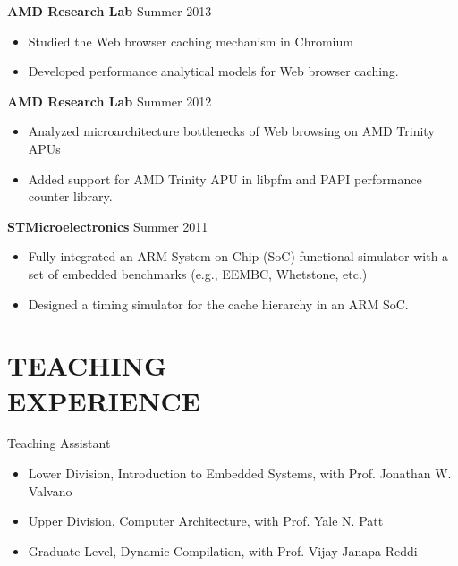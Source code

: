 \documentclass[margin, 9pt]{res} %
\begin{document}
\begin{resume}
{\textbf{AMD Research Lab}} \hfill{Summer 2013}\\
\vspace*{-10pt}
\begin{itemize}[leftmargin=*] \itemsep -3pt
\vspace*{-5pt}
	\item Studied the Web browser caching mechanism in Chromium
	\item Developed performance analytical models for Web browser caching.
\end{itemize}

\medskip
{\textbf{AMD Research Lab}} \hfill{Summer 2012}\\
\vspace*{-10pt}
\begin{itemize}[leftmargin=*] \itemsep -3pt
\vspace*{-5pt}
	\item Analyzed microarchitecture bottlenecks of Web browsing on AMD Trinity APUs
	\item Added support for AMD Trinity APU in libpfm and PAPI performance counter library.
\end{itemize}

\medskip
{\textbf{STMicroelectronics}} \hfill{Summer 2011}\\
\vspace*{-10pt}
\begin{itemize}[leftmargin=*] \itemsep -3pt
\vspace*{-5pt}
	\item Fully integrated an ARM System-on-Chip (SoC) functional simulator with a set of embedded benchmarks (e.g., EEMBC, Whetstone, etc.)
	\item Designed a timing simulator for the cache hierarchy in an ARM SoC.
\end{itemize}


\section{TEACHING\\ EXPERIENCE} 

{\large{Teaching Assistant}}\\
\vspace*{-5pt}
\begin{itemize}[leftmargin=*] \itemsep -2pt
\vspace*{-5pt}
	\item Lower Division, Introduction to Embedded Systems, with Prof. Jonathan W. Valvano
	\item Upper Division, Computer Architecture, with Prof. Yale N. Patt
	\item Graduate Level, Dynamic Compilation, with Prof. Vijay Janapa Reddi
\end{itemize}


\end{resume}
\end{document}
